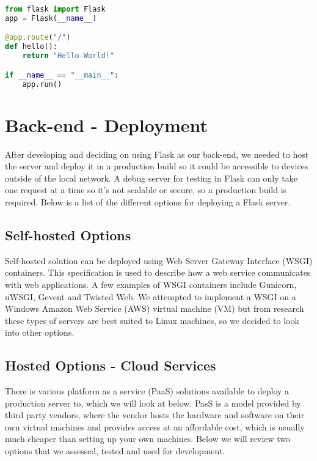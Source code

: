 \begin{lstlisting}[language=PYTHON]
from flask import Flask
app = Flask(__name__)

@app.route("/")
def hello():
    return "Hello World!"

if __name__ == "__main__":
    app.run()

\end{lstlisting}

\section{Back-end - Deployment}
After developing and deciding on using Flask as our back-end, we needed to host the server and deploy it in a production build so it could be accessible to devices outside of the local network. A debug server for testing in Flask can only take one request at a time so it's not scalable or secure, so a production build is required. Below is a list of the different options for deploying a Flask server.

\subsection{Self-hosted Options}
Self-hosted solution can be deployed using Web Server Gateway Interface (WSGI) containers. This specification is used to describe how a web service communicates with web applications. A few examples of WSGI containers include Gunicorn, uWSGI, Gevent and Twisted Web. We attempted to implement a WSGI on a Windows Amazon Web Service (AWS) virtual machine (VM) but from research these types of servers are best suited to Linux machines, so we decided to look into other options.

\subsection{Hosted Options - Cloud Services}
There is various platform as a service (PaaS) solutions available to deploy a production server to, which we will look at below. PasS is a model provided by third party vendors, where the vendor hosts the hardware and software on their own virtual machines and provides access at an affordable cost, which is usually much cheaper than setting up your own machines. Below we will review two options that we assessed, tested and used for development.

